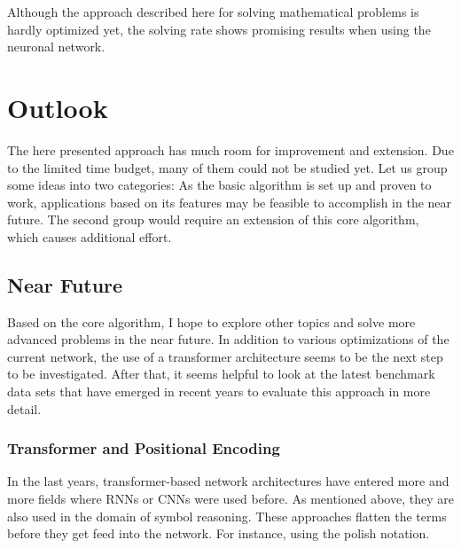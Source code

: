 \documentclass{scrartcl}
\theoremstyle{definition}
\begin{document}

Although the approach described here for solving mathematical problems is hardly optimized yet,
the solving rate shows promising results when using the neuronal network.


\section{Outlook}

The here presented approach has much room for improvement and extension.
Due to the limited time budget, many of them could not be studied yet.
Let us group some ideas into two categories:
As the basic algorithm is set up and proven to work, applications based on its features may be feasible to accomplish in the near future.
The second group would require an extension of this core algorithm, which causes additional effort.

\subsection{Near Future}

Based on the core algorithm, I hope to explore other topics and solve more advanced problems in the near future.
In addition to various optimizations of the current network, the use of a transformer architecture seems to be the next step to be investigated.
After that, it seems helpful to look at the latest benchmark data sets that have emerged in recent years to evaluate this approach in more detail.

\subsubsection{Transformer and Positional Encoding}

In the last years, transformer-based network architectures have entered more and more fields where RNNs or CNNs were used before.
As mentioned above, they are also used in the domain of symbol reasoning.
These approaches flatten the terms before they get feed into the network.
For instance, using the polish notation.
\end{document}
